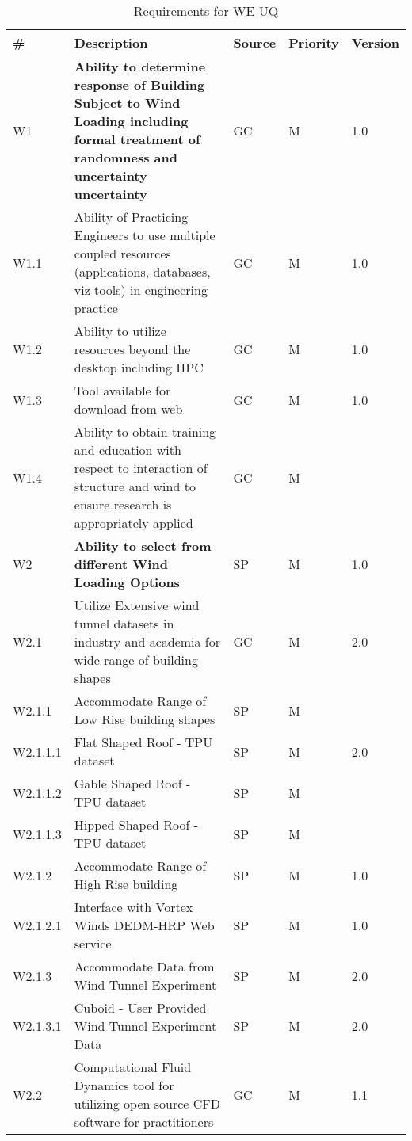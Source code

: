 \begin{longtable}{| p{} | p{} | p{} | p{} |  p{} |}

\caption{Requirements for WE-UQ}
  \label{tab:featureRequirements}  
    \\
   \hline
\rowcolor{lightgray}
\# & Description & Source & Priority & Version \\ \hline

W1 & \textbf{Ability to determine response of Building Subject to Wind Loading including formal treatment of randomness and uncertainty uncertainty} & GC & M & 1.0  \\ \hline
W1.1 & Ability of Practicing Engineers to use multiple coupled resources (applications, databases, viz tools) in engineering practice & GC & M & 1.0  \\ \hline
W1.2 & Ability to utilize resources beyond the desktop including HPC & GC & M & 1.0 \\ \hline
W1.3 & Tool available for download from web & GC & M & 1.0 \\ \hline
W1.4 & Ability to obtain training and education with respect to interaction of structure and wind to ensure research is appropriately applied  & GC & M & \\ \hhline{=====}
W2 & \textbf{Ability to select from different Wind Loading Options } & SP & M & 1.0 \\ \hline
W2.1 & Utilize Extensive wind tunnel datasets in industry and academia for wide range of building shapes & GC & M & 2.0 \\ \hline
W2.1.1 & Accommodate Range of Low Rise building shapes & SP & M &  \\ \hline
W2.1.1.1 & Flat Shaped Roof - TPU dataset & SP & M & 2.0 \\ \hline
W2.1.1.2 & Gable Shaped Roof - TPU dataset & SP & M & \\ \hline
W2.1.1.3 & Hipped Shaped Roof - TPU dataset & SP & M & \\ \hline
W2.1.2 & Accommodate Range of High Rise building  & SP & M & 1.0 \\ \hline
W2.1.2.1 & Interface with Vortex Winds DEDM-HRP Web service & SP & M & 1.0 \\ \hline
W2.1.3 & Accommodate Data from Wind Tunnel Experiment & SP & M & 2.0 \\ \hline
W2.1.3.1 & Cuboid - User Provided Wind Tunnel Experiment Data  & SP & M & 2.0 \\ \hline
W2.2 & Computational Fluid Dynamics tool for utilizing open source CFD software for practitioners & GC & M & 1.1 \\ \hline

\end{longtable}
